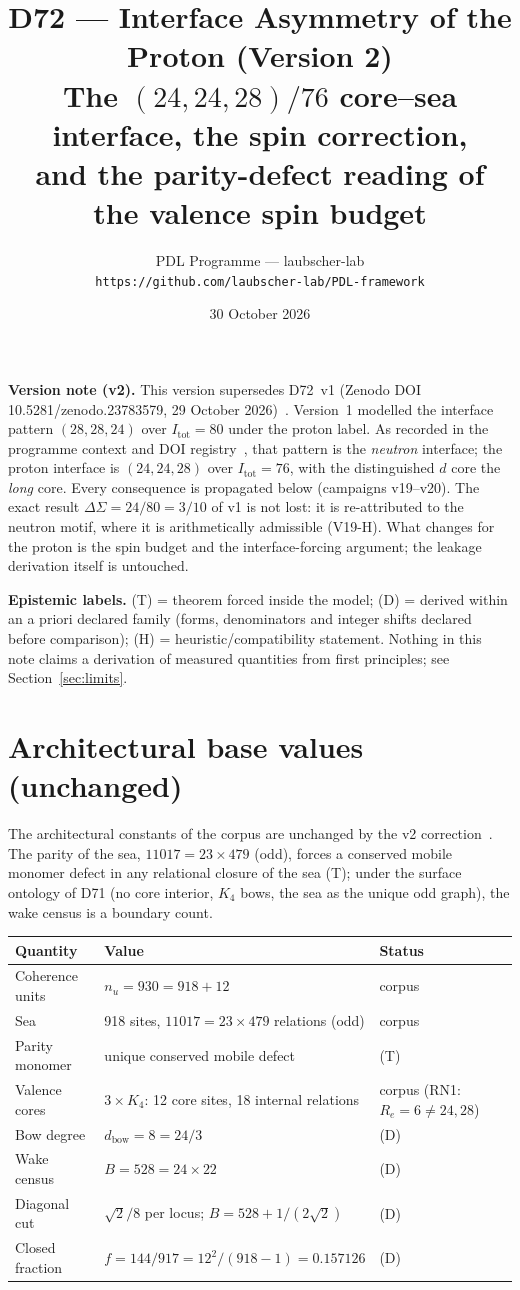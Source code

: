 \documentclass[11pt,a4paper]{article}
\title{\textbf{D72 --- Interface Asymmetry of the Proton (Version 2)}\\[4pt]
\large The $(24,24,28)/76$ core--sea interface, the spin correction,\\
and the parity-defect reading of the valence spin budget}
\author{PDL Programme --- laubscher-lab\\ \texttt{https://github.com/laubscher-lab/PDL-framework}}
\date{30 October 2026}
\begin{document}
\maketitle

\textbf{Version note (v2).} This version supersedes D72~v1 (Zenodo DOI 10.5281/zenodo.23783579, 29 October 2026)~\cite{d72v1}. Version~1 modelled the interface pattern $(28,28,24)$ over $I_{\mathrm{tot}}=80$ under the proton label. As recorded in the programme context and DOI registry~\cite{pdlcontext}, that pattern is the \emph{neutron} interface; the proton interface is $(24,24,28)$ over $I_{\mathrm{tot}}=76$, with the distinguished $d$ core the \emph{long} core. Every consequence is propagated below (campaigns v19--v20). The exact result $\Delta\Sigma = 24/80 = 3/10$ of v1 is not lost: it is re-attributed to the neutron motif, where it is arithmetically admissible (V19-H). What changes for the proton is the spin budget and the interface-forcing argument; the leakage derivation itself is untouched.

\textbf{Epistemic labels.} (T) = theorem forced inside the model; (D) = derived within an a priori declared family (forms, denominators and integer shifts declared before comparison); (H) = heuristic/compatibility statement. Nothing in this note claims a derivation of measured quantities from first principles; see Section~\ref{sec:limits}.

\section{Architectural base values (unchanged)}
The architectural constants of the corpus are unchanged by the v2 correction~\cite{d71,dm36}. The parity of the sea, $11017 = 23 \times 479$ (odd), forces a conserved mobile monomer defect in any relational closure of the sea (T); under the surface ontology of D71 (no core interior, $K_4$ bows, the sea as the unique odd graph), the wake census is a boundary count.

\begin{table}[h]
\centering
\begin{tabular}{lll}
\toprule
Quantity & Value & Status \\
\midrule
Coherence units & $n_u = 930 = 918 + 12$ & corpus \\
Sea & 918 sites, $11017 = 23 \times 479$ relations (odd) & corpus \\
Parity monomer & unique conserved mobile defect & (T) \\
Valence cores & $3 \times K_4$: 12 core sites, 18 internal relations & corpus (RN1: $R_e = 6 \ne 24, 28$) \\
Bow degree & $d_{\mathrm{bow}} = 8 = 24/3$ & (D) \\
Wake census & $B = 528 = 24 \times 22$ & (D) \\
Diagonal cut & $\sqrt{2}/8$ per locus; $B = 528 + 1/(2\sqrt{2})$ & (D) \\
Closed fraction & $f = 144/917 = 12^2/(918-1) = 0.157126$ & (D) \\
\bottomrule
\end{tabular}
\end{table}
\end{document}
